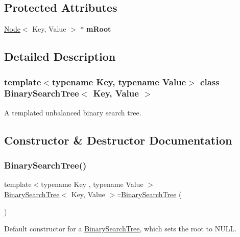 \subsection*{Protected Attributes}
\begin{DoxyCompactItemize}
\item 
\mbox{\label{classBinarySearchTree_a86747f59a7d863080da23a74bea8ed1c}} 
\mbox{\hyperlink{classNode}{Node}}$<$ Key, Value $>$ $\ast$ {\bfseries m\+Root}
\end{DoxyCompactItemize}


\subsection{Detailed Description}
\subsubsection*{template$<$typename Key, typename Value$>$\newline
class Binary\+Search\+Tree$<$ Key, Value $>$}

A templated unbalanced binary search tree. 

\subsection{Constructor \& Destructor Documentation}
\mbox{\label{classBinarySearchTree_ad755ed0485364094f462ce45cf6ecf62}} 
\subsubsection{\texorpdfstring{Binary\+Search\+Tree()}{BinarySearchTree()}}
{\footnotesize\ttfamily template$<$typename Key , typename Value $>$ \\
\mbox{\hyperlink{classBinarySearchTree}{Binary\+Search\+Tree}}$<$ Key, Value $>$\+::\mbox{\hyperlink{classBinarySearchTree}{Binary\+Search\+Tree}} (\begin{DoxyParamCaption}{ }\end{DoxyParamCaption})}

Default constructor for a \mbox{\hyperlink{classBinarySearchTree}{Binary\+Search\+Tree}}, which sets the root to N\+U\+LL. 

